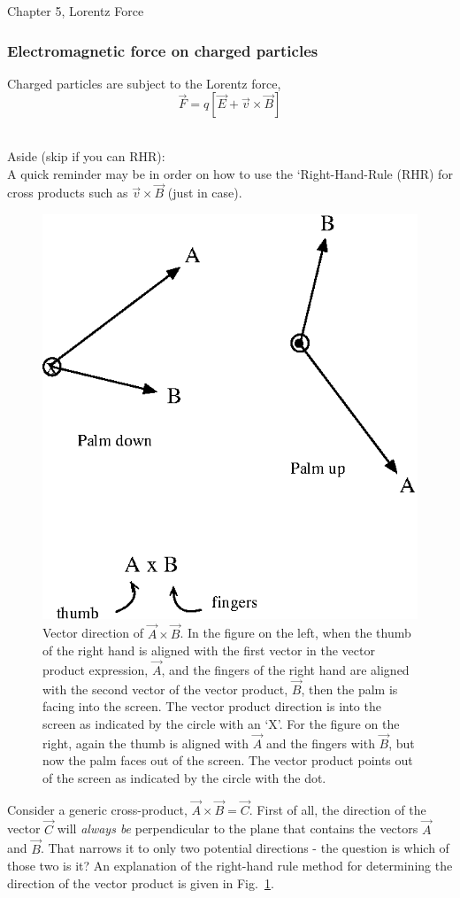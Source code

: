 \documentclass[12pt]{article}
\begin{document}
\begin{flushright} {\color{blue} Chapter 5, Lorentz Force} \end{flushright}
\begin{flushleft}

\subsubsection*{\color{myblue} \bf Electromagnetic force on charged particles}

Charged particles are subject to the Lorentz force,
\[
\vec{F}=q[\vec{E} + \vec{v} \times \vec{B}]
\]

{\color{grey} \hrulefill}\\
Aside (skip if you can RHR):\\
A quick reminder may be in order on how to use the `Right-Hand-Rule (RHR) for cross products such as $\vec{v} \times \vec{B}$ (just in case).

\vspace{.1in}
\begin{figure}[h]
\centering
\includegraphics*[trim=0cm 0cm 0cm 0cm, clip=true, width=0.35\columnwidth]{RHR_vectors.png}
\caption{\small Vector direction of $\vec{A} \times \vec{B}$.  In the figure on the left, when the thumb of the right hand is aligned with the first vector in the vector product expression, $\vec{A}$, and the fingers of the right hand are aligned with the second vector of the vector product, $\vec{B}$, then the palm is facing into the screen.  The vector product direction is into the screen as indicated by the circle with an `X'.   For the figure on the right, again the thumb is aligned with $\vec{A}$ and the fingers with $\vec{B}$, but now the palm faces out of the screen.  The vector product points out of the screen as indicated by the circle with the dot.}
\label{vect_prod}
\end{figure}

Consider a generic cross-product, $\vec{A} \times \vec{B} = \vec{C}$.  First of all, the direction of the vector $\vec{C}$ will {\it always be} perpendicular to the plane that contains the vectors $\vec{A}$ and $\vec{B}$.  That narrows it to only two potential directions - the question is which of those two is it?  An explanation of the right-hand rule method for determining the direction of the vector product is given in Fig.~\ref{vect_prod}.


\end{flushleft}
\end{document}

